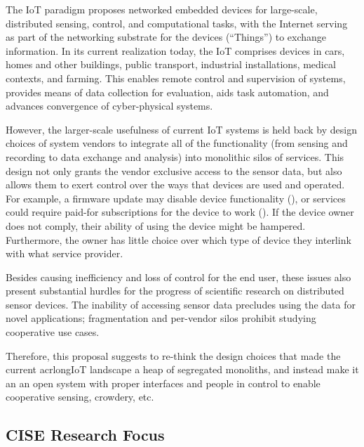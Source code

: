 The \acrfull{IoT} paradigm proposes networked embedded devices
for large-scale, distributed sensing, control, and computational tasks,
with the Internet serving as part of the networking substrate for
the devices (``Things'') to exchange information.
In its current realization today, the \acrlong{IoT} comprises
devices in cars, homes and other buildings, public transport,
industrial installations, medical contexts, and farming.
This enables remote control and supervision of systems, provides
means of data collection for evaluation, aids
task automation, and advances convergence of cyber-physical systems.

However, the larger-scale usefulness of current \acrlong{IoT}
systems is held back by design choices of system vendors to
integrate all of the functionality (from sensing and recording
to data exchange and analysis) into monolithic silos of services.
This design not only grants the vendor exclusive access to the
sensor data, but also allows them to exert control over the ways
that devices are used and operated. For example, a firmware update
may disable device functionality (), or services could
require paid-for subscriptions for the device to work
().
If the device owner does not comply, their ability of using
the device might be hampered. Furthermore, the owner has little
choice over which type of device they interlink with what service
provider.

Besides causing inefficiency and loss of control for the end user,
these issues also present substantial hurdles for the progress
of scientific research on distributed sensor devices.
The inability of accessing sensor data precludes using the
data for novel applications; fragmentation and per-vendor silos
prohibit studying cooperative use cases.

Therefore, this proposal suggests to re-think the design choices
that made the current acrlong{IoT} landscape a heap of segregated
monoliths, and instead make it an an open system with proper interfaces and people in control to enable cooperative sensing, crowdery, etc.


\subsection{CISE Research Focus}


